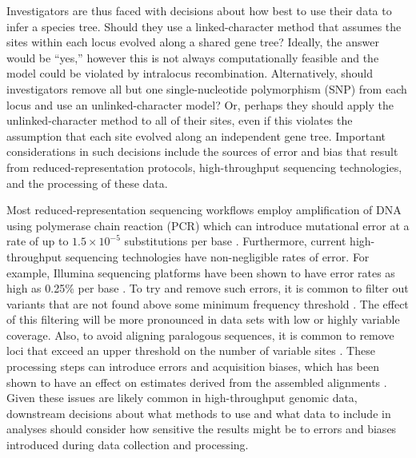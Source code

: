 Investigators are thus faced with decisions about how best to
use their data to infer a species tree.
Should they use a linked-character method that assumes the sites within each
locus evolved along a shared gene tree?
Ideally, the answer would be ``yes,'' however this is not always
computationally feasible and the model could be violated by intralocus
recombination.
Alternatively, should investigators remove all but one single-nucleotide
polymorphism (SNP) from each locus and use an unlinked-character model?
Or, perhaps they should apply the unlinked-character method to all of their
sites, even if this violates the assumption that each site evolved along an
independent gene tree.
Important considerations in such decisions include
the sources of error and bias that result from reduced-representation protocols,
high-throughput sequencing technologies, and the processing of these data.

Most reduced-representation sequencing workflows employ amplification of DNA
using polymerase chain reaction (PCR) which can introduce mutational error at a
rate of up to $1.5\times10^{-5}$ substitutions per base \citep{potapovExaminingSourcesError2017}.
Furthermore, current high-throughput sequencing technologies have non-negligible rates of error.
For example, Illumina sequencing platforms have been shown to have error rates
as high as 0.25\% per base \citep{pfeifferSystematicEvaluationError2018}.
To try and remove such errors,
it is common to filter out variants that are not found above some minimum
frequency threshold
\citep{rochetteStacksAnalyticalMethods2019, linckMinorAlleleFrequency2019}.
The effect of this filtering will be more pronounced in data sets with low or
highly variable coverage.
Also, to avoid aligning paralogous sequences,
it is common to remove loci
that exceed an upper threshold on the number of variable
sites \citep{harveySimilarityThresholdsUsed2015}.
These processing steps can introduce errors and acquisition biases, which has
been shown to have an effect on estimates derived from the assembled alignments
\citep{Harvey2015,linckMinorAlleleFrequency2019}.
Given these issues are likely common in high-throughput genomic data,
downstream decisions about what methods to use and what data to include in
analyses should consider how sensitive the results might be to
errors and biases introduced during data collection and processing.

